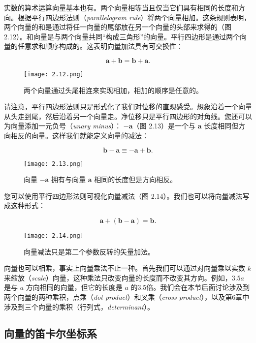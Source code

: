 \documentclass[lang=cn,12pt]{elegantbook}
\begin{document}
实数的算术运算向量基本也有。两个向量相等当且仅当它们具有相同的长度和方向。根据平行四边形法则（\textit{parallelogram rule}）将两个向量相加。这条规则表明，两个向量的和是通过将任一向量的尾部放在另一个向量的头部来求得的（图 2.12）。和向量是与两个向量共同“构成三角形”的向量。平行四边形是通过两个向量的任意求和顺序构成的。这表明向量加法具有可交换性：

$$
  \mathbf{a}+\mathbf{b}=\mathbf{b}+\mathbf{a}.
$$

\begin{figure}[htbp]
  \centering
  \texttt{[image: 2.12.png]}
  \caption{两个向量通过头尾相连来实现相加，相加的顺序是任意的。}
\end{figure}

请注意，平行四边形法则只是形式化了我们对位移的直观感受。想象沿着一个向量从头走到尾，然后沿着另一个向量走。净位移只是平行四边形的对角线。您还可以为向量添加一元负号（\textit{unary minus}）： $-\mathbf{a}$（图 2.13）是一个与 $\mathbf{a}$ 长度相同但方向相反的向量。这样我们就能定义向量的减法：

$$
  \mathbf{b}-\mathbf{a} \equiv -\mathbf{a}+\mathbf{b}.
$$

\begin{figure}[htbp]
  \centering
  \texttt{[image: 2.13.png]}
  \caption{向量 $-\mathbf{a}$ 拥有与向量 $\mathbf{a}$ 相同的长度但是方向相反。}
\end{figure}

您可以使用平行四边形法则可视化向量减法（图 2.14）。我们也可以将向量减法写成这种形式：

$$
  \mathbf{a}+(\mathbf{b}-\mathbf{a})=\mathbf{b}.
$$

\begin{figure}[htbp]
  \centering
  \texttt{[image: 2.14.png]}
  \caption{向量减法只是第二个参数反转的矢量加法。}
\end{figure}

向量也可以相乘，事实上向量乘法不止一种。首先我们可以通过对向量乘以实数 $k$ 来缩放（\textit{scale}）向量，这种乘法只改变向量的长度而不改变其方向。例如，$3.5a$ 是与 $a$ 方向相同的向量，但它的长度是 $a$ 的3.5倍。我们会在本节后面讨论涉及到两个向量的两种乘积，点乘（\textit{dot product}）和叉乘（\textit{cross product}），以及第6章中涉及到三个向量的乘积（行列式，\textit{determinant}）。

\subsection{向量的笛卡尔坐标系}
\end{document}
